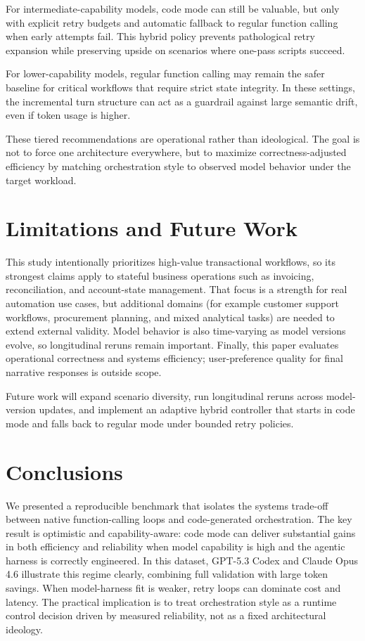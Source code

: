\documentclass[journal,article,submit,pdftex,moreauthors]{Definitions/mdpi}
\begin{document}
For intermediate-capability models, code mode can still be valuable, but only with explicit retry budgets and automatic fallback to regular function calling when early attempts fail. This hybrid policy prevents pathological retry expansion while preserving upside on scenarios where one-pass scripts succeed.

For lower-capability models, regular function calling may remain the safer baseline for critical workflows that require strict state integrity. In these settings, the incremental turn structure can act as a guardrail against large semantic drift, even if token usage is higher.

These tiered recommendations are operational rather than ideological. The goal is not to force one architecture everywhere, but to maximize correctness-adjusted efficiency by matching orchestration style to observed model behavior under the target workload.

\section{Limitations and Future Work}

This study intentionally prioritizes high-value transactional workflows, so its strongest claims apply to stateful business operations such as invoicing, reconciliation, and account-state management. That focus is a strength for real automation use cases, but additional domains (for example customer support workflows, procurement planning, and mixed analytical tasks) are needed to extend external validity. Model behavior is also time-varying as model versions evolve, so longitudinal reruns remain important. Finally, this paper evaluates operational correctness and systems efficiency; user-preference quality for final narrative responses is outside scope.

Future work will expand scenario diversity, run longitudinal reruns across model-version updates, and implement an adaptive hybrid controller that starts in code mode and falls back to regular mode under bounded retry policies.

\section{Conclusions}

We presented a reproducible benchmark that isolates the systems trade-off between native function-calling loops and code-generated orchestration. The key result is optimistic and capability-aware: code mode can deliver substantial gains in both efficiency and reliability when model capability is high and the agentic harness is correctly engineered. In this dataset, GPT-5.3 Codex and Claude Opus 4.6 illustrate this regime clearly, combining full validation with large token savings. When model-harness fit is weaker, retry loops can dominate cost and latency. The practical implication is to treat orchestration style as a runtime control decision driven by measured reliability, not as a fixed architectural ideology.
\end{document}

